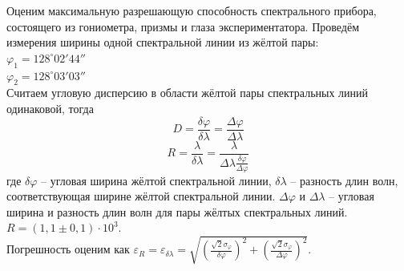 Оценим максимальную разрешающую способность спектрального прибора, состоящего из гониометра, призмы и глаза экспериментатора. Проведём измерения ширины одной спектральной линии из жёлтой пары: \\
$\varphi_1 = 128^\circ 02' 44''$ \\
$\varphi_2 = 128^\circ 03' 03''$ \\
Считаем угловую дисперсию в области жёлтой пары спектральных линий одинаковой, тогда 
$$D = \frac{\delta \varphi}{\delta \lambda} = \frac{\Delta \varphi}{\Delta \lambda}$$
$$R = \frac{\lambda}{\delta \lambda} = \frac{\lambda}{\Delta \lambda \frac{\delta \varphi}{\Delta \varphi}}$$
где $\delta \varphi$ -- угловая ширина жёлтой спектральной линии, $\delta \lambda$ -- разность длин волн, соответствующая ширине жёлтой спектральной линии. $\Delta \varphi$ и $\Delta \lambda$ -- угловая ширина и разность длин волн для пары жёлтых спектральных линий.
$R = (1,1 \pm 0,1) \cdot 10^3$. \\
Погрешность оценим как $\varepsilon_R = \varepsilon_{\delta \lambda} = \sqrt{(\frac{\sqrt{2} \sigma_{\varphi}}{\delta \varphi})^2 + (\frac{\sqrt{2} \sigma_{\varphi}}{\Delta \varphi})^2}$.
